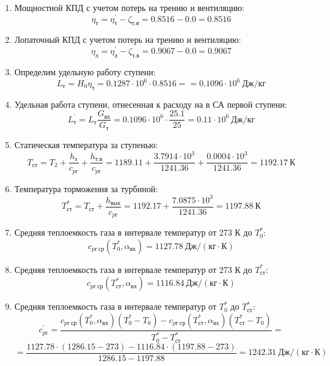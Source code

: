 \documentclass[a4paper,10pt]{article}
\begin{document}
\begin{enumerate}
        \item Мощностной КПД с учетом потерь на трению и вентиляцию:
        \[
            \eta_т = \eta_т^\prime - \zeta_{т.в} =
                0.8516 - 0.0 =
            0.8516
        \]

        \item Лопаточный КПД с учетом потерь на трению и вентиляцию:
        \[
            \eta_л = \eta_л^\prime - \zeta_{т.в} =
                0.9067 - 0.0 =
            0.9067
        \]

        \item Определим удельную работу ступени:
        \[
            L_т = H_0 \eta_т = 0.1287 \cdot 10^6 \cdot 0.8516 =
            = 0.1096 \cdot 10^6 \ Дж/кг
        \]

        \item Удельная работа ступени, отнесенная к расходу на в СА первой ступени:
        \[
            L_т^\prime = L_т \frac{ G_{вх} }{ G_т }  =
                0.1096 \cdot 10^6 \cdot
                \frac{ 25.1 }{ 25 } =
            0.11 \cdot 10^6 \ Дж/кг
        \]

        \item Статическая температура за ступенью:
        \[
            T_{ст} = T_2 + \frac{ h_з }{ c_{pг} } + \frac{ h_{т.в} }{ c_{pг} } =
                1189.11 +
                \frac{3.7914 \cdot 10^3 }{ 1241.36 } +
                \frac{ 0.0004 \cdot 10^3 }{ 1241.36 } =
            1192.17 \ К
        \]

        \item Температура торможения за турбиной:
        \[
            T_{ст}^* = T_{ст} + \frac{ h_{вых} }{ c_{pг} } =
                1192.17 +
                \frac{ 7.0875 \cdot 10^3 }{ 1241.36 } =
            1197.88 \ К
        \]

        \item Средняя теплоемкость газа в интервале температур от 273 К до $T_0^*$:
        \[
            c_{pг\ ср} (T_0^*, \alpha_{вх}) =
            1127.78 \ Дж/(кг \cdot К)
        \]

        \item Средняя теплоемкость газа в интервале температур от 273 К до $T_{ст}^*$:
        \[
            c_{pг\ ср} (T_{ст}^*, \alpha_{вх}) =
            1116.84 \ Дж/(кг \cdot К)
        \]

        \item Средняя теплоемкость газа в интервале температур от $T_0^*$ до $T_{ст}^*$:
        \[
            c_{pг}^\prime = \frac{
		        c_{pг\ ср} (T_0^*, \alpha_{вх}) (T_0^* - T_0) - c_{pг\ ср} (T_{ст}^*, \alpha_{вх})(T_{ст}^* - T_0)
		    }{
		        T_0^* - T_{ст}^*} =\]
        \[    =\frac{
		        1127.78 \cdot
                (1286.15 - 273) -
		        1116.84 \cdot
                (1197.88 - 273)
		    }{
		        1286.15 - 1197.88} =
		    1242.31 \ Дж / (кг \cdot К)
        \]


\end{enumerate}
\end{document}

